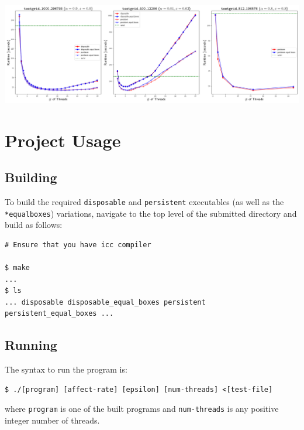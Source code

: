 \documentclass{article}
\begin{document}
\vspace{3em}
\begin{minipage}{\linewidth}
    \centering
    \includegraphics[width=\linewidth]{../results/plot.png}


    \label{fig:runtimes}
\end{minipage}

\newpage
\section*{Project Usage}
\label{sec:project}

\subsection*{Building}
\label{subsec:building}

To build the required \texttt{disposable} and \texttt{persistent} executables
(as well as the \texttt{*\textunderscore equal\textunderscore boxes}) variations, navigate to the top level
of the submitted directory and build as follows:

\begin{lstlisting}[style=DOS]
# Ensure that you have icc compiler

$ make
...
$ ls
... disposable disposable_equal_boxes persistent persistent_equal_boxes ...
\end{lstlisting}

\subsection*{Running}
\label{subsec:running}

The syntax to run the program is:

\begin{lstlisting}[style=DOS]
$ ./[program] [affect-rate] [epsilon] [num-threads] <[test-file]
\end{lstlisting}

where \texttt{program} is one of the built programs and \texttt{num-threads} is
any positive integer number of threads.
\end{document}

